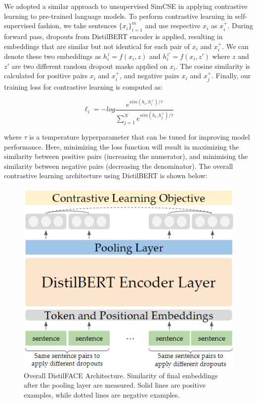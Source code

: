 \documentclass[10pt,twocolumn,letterpaper]{article}
\begin{document}
We adopted a similar approach to unsupervised SimCSE \cite{2104.08821} in applying contrastive learning to pre-trained language models. To perform contrastive learning in self-supervised fashion, we take sentences \(\{x_i\}^m_{i=1}\) and use respective \(x_i\) as \(x_i^+\). During forward pass, dropouts from DistilBERT encoder is applied, resulting in embeddings that are similar but not identical for each pair of \(x_i\) and \(x_i^+\). We can denote these two embeddings as \(h_i^{z} = f(x_i, z)\) and \(h_i^{z'} = f(x_i, z')\) where \(z\) and \(z'\) are two different random dropout masks applied on \(x_i\). The cosine similarity is calculated for positive pairs \(x_i\) and \(x_i^+\), and negative pairs \(x_i\) and \(x_j^+\). Finally, our training loss for contrastive learning is computed as:

\[ \ell_i = -log \frac{e^{sim(h_i, h_i^+)/\tau}}{\sum_{j=1}^N e^{sim(h_i, h_j^+)/\tau}} \]

where \( \tau \) is a temperature hyperparameter that can be tuned for improving model performance. Here, minimizing the loss function will result in maximizing the similarity between positive pairs (increasing the numerator), and minimising the similarity between negative pairs (decreasing the denominator). The overall contrastive learning architecture using DistilBERT is shown below:

\begin{figure}[hbt!]
\centering
\includegraphics[scale=0.65]{images/DistilFACE-Architecture.png}
\caption{Overall DistilFACE Architecture. Similarity of final embeddings after the pooling layer are measured. Solid lines are positive examples, while dotted lines are negative examples.}
\label{fig:short}
\end{figure}
\end{document}
